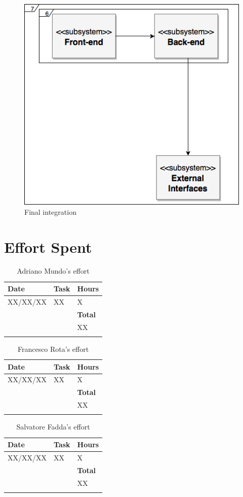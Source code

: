 \documentclass{article}
\begin{document}
	\begin{figure}[H]
			\centering
			\includegraphics[scale=0.5]{Images/Diagrams/IntegrationDiagram3.png}
			\caption{Final integration}
	\end{figure}
	\pagebreak
		
\section{Effort Spent}
\begin{longtable}{| p{2 cm} | p{6 cm} | p{1 cm} |} 
			\hline
			{\bf Date} & {\bf Task} & {\bf Hours}\\
			\hline
			XX/XX/XX & XX & X \\
			\hline
			& & {\bf Total} \\
			\hline
			& & XX \\
			\hline
			\caption{Adriano Mundo's effort} 
\end{longtable}

\begin{longtable}{| p{2 cm} | p{6 cm} | p{1 cm} |} 
			\hline
			{\bf Date} & {\bf Task} & {\bf Hours}\\
			\hline
			XX/XX/XX & XX & X \\
			\hline
			& & {\bf Total} \\
			\hline
			& & XX \\
			\hline
			\caption{Francesco Rota's effort} 
\end{longtable}

\begin{longtable}{| p{2 cm} | p{6 cm} | p{1 cm} |} 
			\hline
			{\bf Date} & {\bf Task} & {\bf Hours}\\
			\hline
			XX/XX/XX & XX & X \\
			\hline
			& & {\bf Total} \\
			\hline
			& & XX \\
			\hline
			\caption{Salvatore Fadda's effort} 
\end{longtable}
	
	
\end{document}

